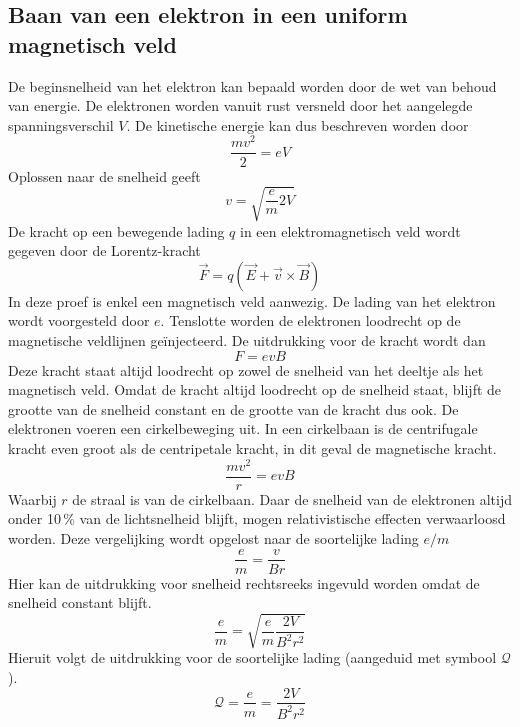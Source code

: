 
\subsection{Baan van een elektron in een uniform magnetisch veld}

De beginsnelheid van het elektron kan bepaald worden door de wet van behoud van 
energie. De elektronen worden vanuit rust versneld door het aangelegde 
spanningsverschil $V$. De kinetische energie kan dus beschreven worden door
$$
\frac{mv^2}{2} = eV
$$
Oplossen naar de snelheid geeft
$$
v = \sqrt{ \frac{e}{m} 2V }
$$
De kracht op een bewegende lading $q$ in een elektromagnetisch veld wordt 
gegeven door de Lorentz-kracht
$$
\vec{F} = q(\vec{E} + \vec{v} \times \vec{B})
$$
In deze proef is enkel een magnetisch veld aanwezig. De lading van het elektron 
wordt voorgesteld door $e$. Tenslotte worden de elektronen loodrecht op de 
magnetische veldlijnen ge\"injecteerd. De uitdrukking voor de kracht wordt dan
$$
F = e v B
$$
Deze kracht staat altijd loodrecht op zowel de snelheid van het deeltje als het 
magnetisch veld. Omdat de kracht altijd loodrecht op de snelheid staat, blijft 
de grootte van de snelheid constant en de grootte van de kracht dus ook. De 
elektronen voeren een cirkelbeweging uit. In een cirkelbaan is de centrifugale 
kracht even groot als de centripetale kracht, in dit geval de magnetische 
kracht.
$$
\frac{mv^2}{r} = evB
$$
Waarbij $r$ de straal is van de cirkelbaan.
Daar de snelheid van de elektronen altijd onder 10\,\% van de lichtsnelheid 
blijft, mogen relativistische effecten verwaarloosd worden. Deze vergelijking 
wordt opgelost naar de soortelijke lading $e/m$
$$
\frac{e}{m} = \frac{v}{Br}
$$
Hier kan de uitdrukking voor snelheid rechtsreeks ingevuld worden omdat de 
snelheid constant blijft.
$$
\frac{e}{m} = \sqrt{\frac{e}{m} \frac{2V}{B^2r^2}}
$$
Hieruit volgt de uitdrukking voor de soortelijke lading (aangeduid met symbool 
$\mathcal{Q}$).
$$
\mathcal{Q} = \frac{e}{m} = \frac{2V}{B^2r^2}
$$
